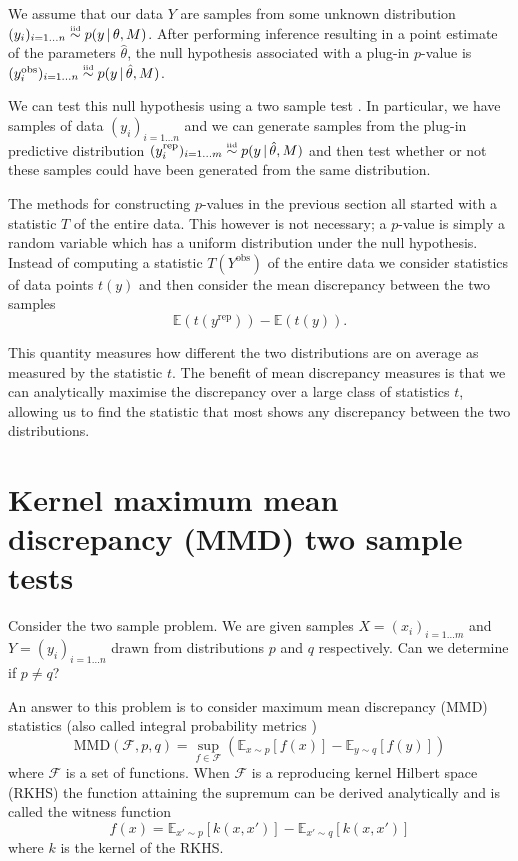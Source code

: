 We assume that our data $Y$ are \iid samples from some unknown distribution ${(y_i)_{i=1\ldots n} \overset{\mbox{\tiny iid}}{\sim} p(y\,|\, \theta, M)}$.
After performing inference resulting in a point estimate of the parameters $\hat\theta$, the null hypothesis associated with a plug-in $p$-value is ${(y^\textrm{obs}_i)_{i=1\ldots n} \overset{\mbox{\tiny iid}}{\sim} p(y \,|\, \hat\theta, M)}$.

We can test this null hypothesis using a two sample test \citep[e.g.][]{Friedman1979-ur, Bickel1969-ao, Hotelling1951-jd}.
In particular, we have samples of data $(y_i)_{i=1\ldots n}$ and we can generate samples from the plug-in predictive distribution ${(y_i^\textrm{rep})_{i=1\ldots m} \overset{\mbox{\tiny iid}}{\sim} p(y \,|\, \hat\theta, M)}$ and then test whether or not these samples could have been generated from the same distribution.

The methods for constructing $p$-values in the previous section all started with a statistic $T$ of the entire data.
This however is not necessary; a $p$-value is simply a random variable which has a uniform distribution under the null hypothesis.
Instead of computing a statistic $T(Y^\textrm{obs})$ of the entire data we consider statistics of data points $t(y)$ and then consider the mean discrepancy between the two samples
\begin{equation}
\mathbb{E}(t(y^\textrm{rep})) - \mathbb{E}(t(y)).
\end{equation}

This quantity measures how different the two distributions are on average as measured by the statistic $t$.
The benefit of mean discrepancy measures is that we can analytically maximise the discrepancy over a large class of statistics $t$, allowing us to find the statistic that most shows any discrepancy between the two distributions.

\section{Kernel maximum mean discrepancy (MMD) two sample tests}

Consider the two sample problem. We are given samples ${X = (x_i)_{i=1\ldots m}}$ and ${Y = (y_i)_{i=1\ldots n}}$ drawn \iid from distributions $p$ and $q$ respectively.
Can we determine if $p \neq q$?

An answer to this problem is to consider maximum mean discrepancy (MMD) \citep{Gretton2008-gs} statistics (also called integral probability metrics \citep{Muller1997-vs})
\begin{equation}
\textrm{MMD}(\mathcal{F},p,q) = \sup_{f \in \mathcal{F}}(\mathbb{E}_{x\sim p}[f(x)] - \mathbb{E}_{y\sim q}[f(y)])
\label{eq:MMD}
\end{equation}
where $\mathcal{F}$ is a set of functions.
When $\mathcal{F}$ is a reproducing kernel Hilbert space (RKHS) the function attaining the supremum can be derived analytically and is called the witness function
\begin{equation}
f(x) = \mathbb{E}_{x'\sim p}[k(x,x')] - \mathbb{E}_{x'\sim q}[k(x,x')]
\label{eq:witness}
\end{equation}
where $k$ is the kernel of the RKHS.

